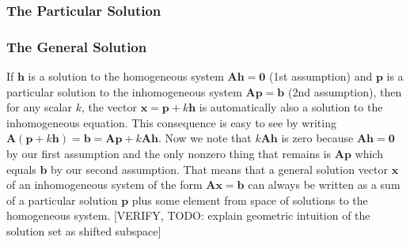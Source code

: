 
\subsubsection{The Particular Solution}


\subsubsection{The General Solution}
If $\mathbf{h}$ is a solution to the homogeneous system $\mathbf{A h = 0}$ (1st assumption) and $\mathbf{p}$ is a particular solution to the inhomogeneous system $\mathbf{A p = b}$ (2nd assumption), then for any scalar $k$, the vector $\mathbf{x} = \mathbf{p} + k \mathbf{h}$ is automatically also a solution to the inhomogeneous equation. This consequence is easy to see by writing $\mathbf{A} (\mathbf{p} + k \mathbf{h}) = \mathbf{b} = \mathbf{A p} + k \mathbf{A h}$. Now we note that $k \mathbf{A h}$ is zero because $\mathbf{A h = 0}$ by our first assumption and the only nonzero thing that remains is $\mathbf{A p}$ which equals $\mathbf{b}$ by our second assumption. That means that a general solution vector $\mathbf{x}$ of an inhomogeneous system of the form $\mathbf{A x = b}$ can always be written as a sum of a particular solution $\mathbf{p}$ plus some element from space of solutions to the homogeneous system. [VERIFY, TODO: explain geometric intuition of the solution set as shifted subspace]





